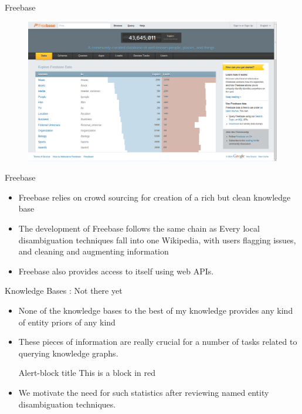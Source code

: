 \documentclass{beamer}
\begin{document}
\begin{frame}{Freebase}
\begin{figure}[h]
 \centering
 \includegraphics[bb=0 0 1366 768,scale=0.25]{./freebase.png}
\end{figure}
 
\end{frame}
\begin{frame}{Freebase}
\begin{itemize}
 \item Freebase relies on crowd sourcing for creation of a rich but clean knowledge base \medskip
 \item The development of Freebase follows the same chain as Every local disambiguation techniques fall into one
Wikipedia, with users flagging issues, and cleaning and augmenting information \medskip
\item Freebase also provides access to itself using web APIs.
\end{itemize}
\end{frame}

\begin{frame}{Knowledge Bases : Not there yet}
 \begin{itemize}
  \item None of the knowledge bases to the best of my knowledge provides any kind of entity priors
  of any kind
  \item These pieces of information are really crucial for a number of tasks related to querying knowledge
  graphs.
  \begin{alertblock}{Alert-block title}
This is a block in red
\end{alertblock}
  \item We motivate the need for such statistics after reviewing named entity disambiguation techniques. 
 \end{itemize}

\end{frame}
\end{document}
